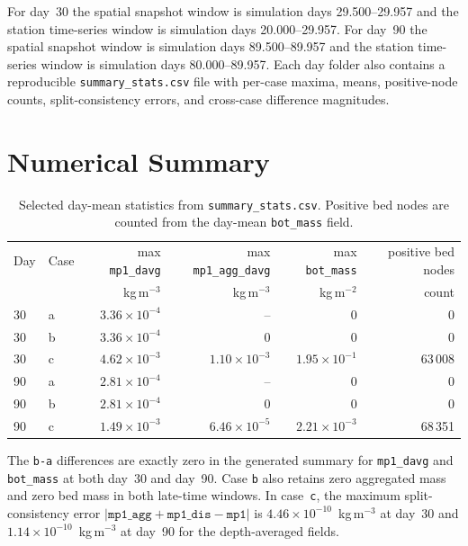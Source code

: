 \documentclass[11pt]{article}
\begin{document}
For day~30 the spatial snapshot window is simulation days
29.500--29.957 and the station time-series window is simulation days
20.000--29.957.  For day~90 the spatial snapshot window is simulation days
89.500--89.957 and the station time-series window is simulation days
80.000--89.957.  Each day folder also contains a reproducible
\texttt{summary\_stats.csv} file with per-case maxima, means, positive-node
counts, split-consistency errors, and cross-case difference magnitudes.

\section*{Numerical Summary}

\begin{table}[H]
\centering
\caption{Selected day-mean statistics from \texttt{summary\_stats.csv}.
         Positive bed nodes are counted from the day-mean
         \texttt{bot\_mass} field.}
\label{tab:late_summary}
\begin{tabular}{llrrrr}
\toprule
Day & Case & max \texttt{mp1\_davg} & max \texttt{mp1\_agg\_davg}
    & max \texttt{bot\_mass} & positive bed nodes \\
    &      & kg\,m$^{-3}$ & kg\,m$^{-3}$ & kg\,m$^{-2}$ & count \\
\midrule
30 & a & $3.36\times10^{-4}$ & --                 & $0$                 & 0 \\
30 & b & $3.36\times10^{-4}$ & $0$                & $0$                 & 0 \\
30 & c & $4.62\times10^{-3}$ & $1.10\times10^{-3}$& $1.95\times10^{-1}$ & 63\,008 \\
\midrule
90 & a & $2.81\times10^{-4}$ & --                 & $0$                 & 0 \\
90 & b & $2.81\times10^{-4}$ & $0$                & $0$                 & 0 \\
90 & c & $1.49\times10^{-3}$ & $6.46\times10^{-5}$& $2.21\times10^{-3}$ & 68\,351 \\
\bottomrule
\end{tabular}
\end{table}

The \texttt{b-a} differences are exactly zero in the generated summary for
\texttt{mp1\_davg} and \texttt{bot\_mass} at both day~30 and day~90.  Case
\texttt{b} also retains zero aggregated mass and zero bed mass in both
late-time windows.  In case~\texttt{c}, the maximum split-consistency error
$|\texttt{mp1\_agg}+\texttt{mp1\_dis}-\texttt{mp1}|$ is
$4.46\times10^{-10}$~kg\,m$^{-3}$ at day~30 and
$1.14\times10^{-10}$~kg\,m$^{-3}$ at day~90 for the depth-averaged fields.
\end{document}
